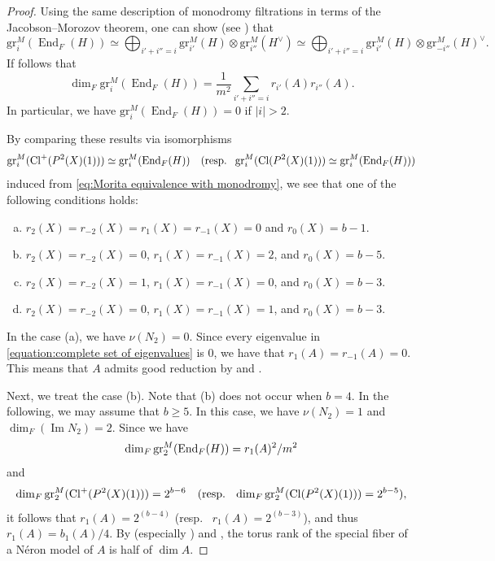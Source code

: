 \documentclass[12pt,reqno]{amsart}
\theoremstyle{definition}
\newcommand\End{\mathop{\mathrm{End}}\nolimits}
\newcommand\gr{\text{\rm gr}}
\newcommand\Cl{\mathop{\mathrm{Cl}}\nolimits}
\renewcommand\Im{\mathop{\mathrm{Im}}\nolimits}
\numberwithin{equation}{section}
\begin{document}
\begin{proof}
Using the same description of monodromy filtrations in terms of the Jacobson--Morozov theorem, one can show (see \cite[Proposition 1.6.9]{WeilII}) that
\[
\mathrm{gr}^M_i(\End_{F} (H)) \simeq \bigoplus_{i'+i''=i} \mathrm{gr}^M_{i'}(H) \otimes \mathrm{gr}^M_{i''}(H^\vee) \simeq \bigoplus_{i'+i''=i} \mathrm{gr}^M_{i'}(H) \otimes \mathrm{gr}^M_{-i''}(H)^\vee.
\]
If follows that
\[
\dim_F \mathrm{gr}^M_i(\End_{F} (H)) = \frac{1}{m^2}\sum_{i'+i''=i} r_{i'}(A) r_{i''}(A).
\]
In particular, we have $\mathrm{gr}^M_i(\End_{F} (H))=0$ if
$\vert i \vert > 2$.

By comparing these results via isomorphisms
\[
\mathrm{gr}^M_i(\Cl^+(P^2(X)(1))) \simeq \mathrm{gr}^M_i(\End_{F} (H)) \quad (\textup{resp.~ } \mathrm{gr}^M_i(\Cl(P^2(X)(1))) \simeq \mathrm{gr}^M_i(\End_{F} (H)))
\]
induced from \eqref{eq:Morita equivalence with monodromy},
we see that one of the following conditions holds:
\begin{enumerate}[(a)]
    \item
    $r_{2}(X) = r_{ -2}(X) = r_{1}(X)= r_{-1}(X)=0$ and $r_{ 0}(X) = b-1$.
    \item 
    $r_{2}(X)= r_{-2}(X) =0$, $r_{1}(X) = r_{-1}(X)=2$, and $r_{ 0}(X)= b-5$.
    \item 
    $r_{2}(X)= r_{-2}(X) =1$, $r_{1}(X) = r_{-1}(X)=0$, and $r_{ 0}(X)= b-3$.
    \item 
   $r_{2}(X)= r_{-2}(X) =0$, $r_{1}(X) = r_{-1}(X)=1$, and $r_{ 0}(X)= b-3$.
\end{enumerate}


In the case (a),
we have $\nu(N_{2}) =0$.
Since every eigenvalue in \eqref{equation:complete set of eigenvalues} is $0$, we have that $r_{1}(A) = r_{-1}(A) =0$. This means that $A$ admits good reduction
by \cite[Theorem 1]{Serre-Tate68} and \cite[Part II, Theorem 4.7]{Coleman-Iovita}.

Next, we treat the case (b).
Note that (b) does not occur when $b =4$.
In the following, we may assume that $b \geq 5$.
In this case, we have $\nu (N_{2}) = 1$ and $\dim_{F} (\Im N_{2}) =2$.
Since we have
\[
\dim_F \gr_2^M(\End_F(H))=r_1(A)^2/m^2
\]
and
\[
\dim_F \gr_2^M(\Cl^+(P^2(X)(1))) =2^{b-6} \quad (\text{resp.~ } \dim_F \gr_2^M(\Cl(P^2(X)(1)))=2^{b-5} ),
\]
it follows that
$
r_{1}(A) = 2^{(b-4)}
$
(resp.~ $r_{1}(A) = 2^{(b-3)}$), and thus $r_1(A)=b_1(A)/4$.
By \cite[Expos\'e IX]{SGA7-I} (especially \cite[Expos\'e IX, Proposition 3.5]{SGA7-I}) and \cite[Part II, Proposition 4.5]{Coleman-Iovita},
the torus rank of the special fiber of a N\'{e}ron model of $A$ is half of $\dim A$.



\end{proof}
\end{document}

